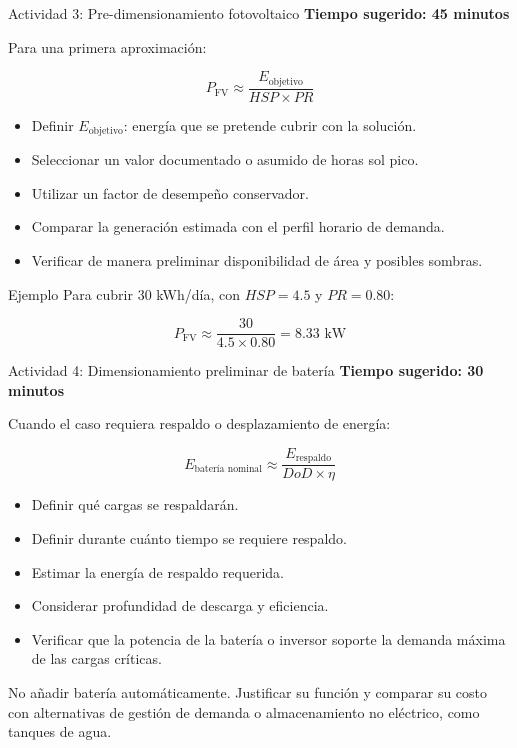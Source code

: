 \documentclass[aspectratio=169,10pt]{beamer}
\begin{document}
\begin{frame}{Actividad 3: Pre-dimensionamiento fotovoltaico}
\textbf{Tiempo sugerido: 45 minutos}

Para una primera aproximación:

\[
P_{\text{FV}} \approx \frac{E_{\text{objetivo}}}{HSP \times PR}
\]

\begin{itemize}
    \item Definir \(E_{\text{objetivo}}\): energía que se pretende cubrir con la solución.
    \item Seleccionar un valor documentado o asumido de horas sol pico.
    \item Utilizar un factor de desempeño conservador.
    \item Comparar la generación estimada con el perfil horario de demanda.
    \item Verificar de manera preliminar disponibilidad de área y posibles sombras.
\end{itemize}

\begin{exampleblock}{Ejemplo}
Para cubrir \(30\) kWh/día, con \(HSP=4.5\) y \(PR=0.80\):

\[
P_{\text{FV}} \approx \frac{30}{4.5 \times 0.80} = 8.33 \text{ kW}
\]
\end{exampleblock}
\end{frame}

\begin{frame}{Actividad 4: Dimensionamiento preliminar de batería}
\textbf{Tiempo sugerido: 30 minutos}

Cuando el caso requiera respaldo o desplazamiento de energía:

\[
E_{\text{batería nominal}} \approx \frac{E_{\text{respaldo}}}{DoD \times \eta}
\]

\begin{itemize}
    \item Definir qué cargas se respaldarán.
    \item Definir durante cuánto tiempo se requiere respaldo.
    \item Estimar la energía de respaldo requerida.
    \item Considerar profundidad de descarga y eficiencia.
    \item Verificar que la potencia de la batería o inversor soporte la demanda máxima de las cargas críticas.
\end{itemize}

\alert{No añadir batería automáticamente. Justificar su función y comparar su costo con alternativas de gestión de demanda o almacenamiento no eléctrico, como tanques de agua.}
\end{frame}
\end{document}
